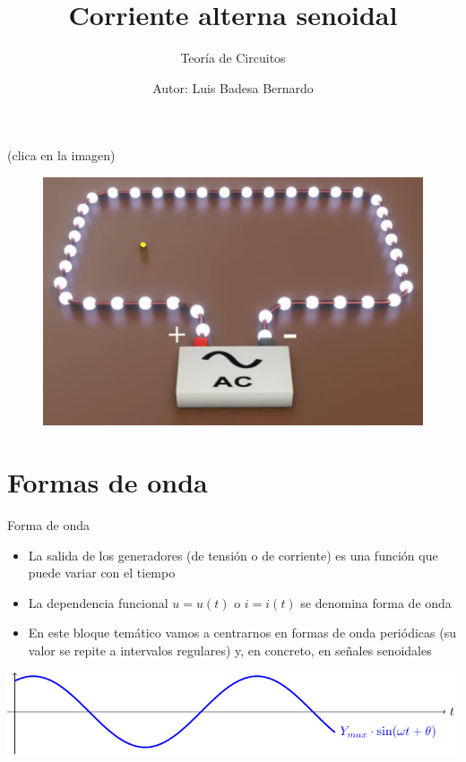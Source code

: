 \documentclass[aspectratio=169, usenames,svgnames,dvipsnames]{beamer}
\author{Autor: \hspace{2mm} Luis Badesa Bernardo}
\date{}
\title{Corriente alterna senoidal \vspace{3mm}}
\subtitle{Teoría de Circuitos}
\begin{document}
\maketitle

\begin{frame}
    \vspace{3mm}
    (\alert{clica en la imagen})

    \vspace{3mm}
    \begin{figure}[H]
        \centering
        \href{https://youtu.be/jIrHkRJVK-U?t=58}{\includegraphics[width=.6\linewidth]{../figs/ac_flow.jpg}}
    \end{figure}
\end{frame}




\section{Formas de onda}

\begin{frame}{Forma de onda}
    \begin{itemize}
        \item La salida de los generadores (de tensión o de corriente) es una función que puede variar con el tiempo
        \item La dependencia funcional \(u = u(t)\) o \(i = i(t)\) se denomina forma de onda

        \vspace{8mm}
        \item En este bloque temático vamos a centrarnos en \alert{formas de onda periódicas} (su valor se repite a intervalos regulares) y, en concreto, en \alert{señales senoidales}
    \end{itemize}
    \begin{center}
        \includegraphics[width=.85\linewidth]{../figs/sin.pdf}
    \end{center}        
\end{frame}
\end{document}
